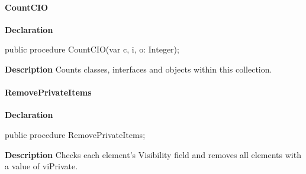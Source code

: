 \documentclass{report}
\newif\ifpdf
\begin{document}
\paragraph*{CountCIO}\hspace*{\fill}

\label{PasDoc_Items.TPasItems-CountCIO}
\begin{list}{}{
\setlength{\itemindent}{0cm}
\setlength{\listparindent}{0cm}
\setlength{\leftmargin}{\evensidemargin}
\addtolength{\leftmargin}{\tmplength}
\settowidth{\labelsep}{X}
\addtolength{\leftmargin}{\labelsep}
\setlength{\labelwidth}{\tmplength}
}
\item[\textbf{Declaration}\hfill]
\ifpdf
\begin{flushleft}
\fi
\begin{ttfamily}
public procedure CountCIO(var c, i, o: Integer);\end{ttfamily}

\ifpdf
\end{flushleft}
\fi

\par
\item[\textbf{Description}]
Counts classes, interfaces and objects within this collection.

\end{list}
\paragraph*{RemovePrivateItems}\hspace*{\fill}

\label{PasDoc_Items.TPasItems-RemovePrivateItems}
\begin{list}{}{
\setlength{\itemindent}{0cm}
\setlength{\listparindent}{0cm}
\setlength{\leftmargin}{\evensidemargin}
\addtolength{\leftmargin}{\tmplength}
\settowidth{\labelsep}{X}
\addtolength{\leftmargin}{\labelsep}
\setlength{\labelwidth}{\tmplength}
}
\item[\textbf{Declaration}\hfill]
\ifpdf
\begin{flushleft}
\fi
\begin{ttfamily}
public procedure RemovePrivateItems;\end{ttfamily}

\ifpdf
\end{flushleft}
\fi

\par
\item[\textbf{Description}]
Checks each element's Visibility field and removes all elements with a value of viPrivate.

\end{list}
\end{document}
